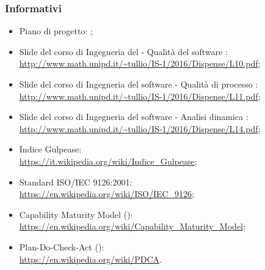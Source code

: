 \documentclass[PianoDiQualifica.tex]{subfiles}
\begin{document}
		\subsubsection{Informativi}
			\begin{itemize}
				\item Piano di progetto: \PPdocRR{};
				\item Slide del corso di Ingegneria del  - Qualità del software : \\
				\url{http://www.math.unipd.it/~tullio/IS-1/2016/Dispense/L10.pdf};
				\item Slide del corso di Ingegneria del software - Qualità di processo : \\
				\url{http://www.math.unipd.it/~tullio/IS-1/2016/Dispense/L11.pdf};
				\item Slide del corso di Ingegneria del software - Analisi dinamica : \\
				\url{http://www.math.unipd.it/~tullio/IS-1/2016/Dispense/L14.pdf};
				\item Indice Gulpease: \\
				\url{https://it.wikipedia.org/wiki/Indice_Gulpease};
				\item Standard ISO/IEC 9126:2001: \\
				\url{https://en.wikipedia.org/wiki/ISO/IEC_9126};
				\item Capability Maturity Model (): \\
				\url{https://en.wikipedia.org/wiki/Capability_Maturity_Model};
				\item Plan-Do-Check-Act (): \\
				\url{https://en.wikipedia.org/wiki/PDCA}.
			\end{itemize}
			
\end{document}
